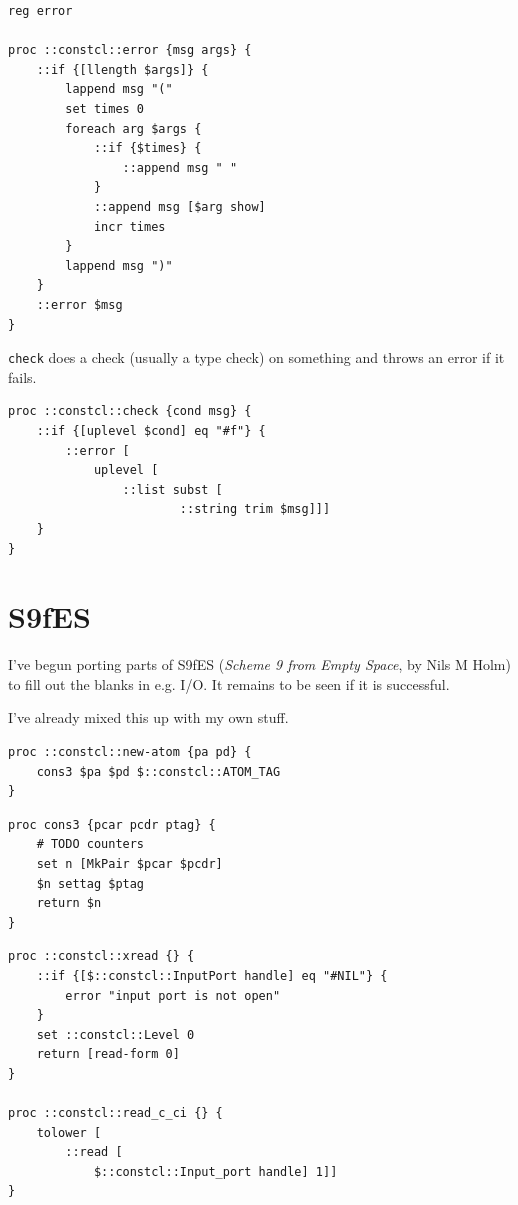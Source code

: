 \documentclass[twoside,9pt]{report}
\begin{document}
\noindent\makebox[\linewidth]{\rule{\linewidth}{0.4pt}}
\begin{lstlisting}
reg error
 
proc ::constcl::error {msg args} {
    ::if {[llength $args]} {
        lappend msg "("
        set times 0
        foreach arg $args {
            ::if {$times} {
                ::append msg " "
            }
            ::append msg [$arg show]
            incr times
        }
        lappend msg ")"
    }
    ::error $msg
}
\end{lstlisting}
\noindent\makebox[\linewidth]{\rule{\linewidth}{0.4pt}}

\texttt{check} does a check (usually a type check) on something and throws an error if it fails.

\noindent\makebox[\linewidth]{\rule{\linewidth}{0.4pt}}
\begin{lstlisting}
proc ::constcl::check {cond msg} {
    ::if {[uplevel $cond] eq "#f"} {
        ::error [
            uplevel [
                ::list subst [
                        ::string trim $msg]]]
    }
}
\end{lstlisting}
\noindent\makebox[\linewidth]{\rule{\linewidth}{0.4pt}}
\section{S9fES}
\label{s9fes}

I've begun porting parts of S9fES (\emph{Scheme 9 from Empty Space}, by Nils M Holm) to fill out the blanks in e.g. I/O. It remains to be seen if it is successful.


I've already mixed this up with my own stuff.

\noindent\makebox[\linewidth]{\rule{\linewidth}{0.4pt}}
\begin{lstlisting}
proc ::constcl::new-atom {pa pd} {
    cons3 $pa $pd $::constcl::ATOM_TAG
}
\end{lstlisting}
\noindent\makebox[\linewidth]{\rule{\linewidth}{0.4pt}}
\noindent\makebox[\linewidth]{\rule{\linewidth}{0.4pt}}
\begin{lstlisting}
proc cons3 {pcar pcdr ptag} {
    # TODO counters
    set n [MkPair $pcar $pcdr]
    $n settag $ptag
    return $n
}
\end{lstlisting}
\noindent\makebox[\linewidth]{\rule{\linewidth}{0.4pt}}
\noindent\makebox[\linewidth]{\rule{\linewidth}{0.4pt}}
\begin{lstlisting}
proc ::constcl::xread {} {
    ::if {[$::constcl::InputPort handle] eq "#NIL"} {
        error "input port is not open"
    }
    set ::constcl::Level 0
    return [read-form 0]
}
 
proc ::constcl::read_c_ci {} {
    tolower [
        ::read [
            $::constcl::Input_port handle] 1]]
}
\end{lstlisting}
\noindent\makebox[\linewidth]{\rule{\linewidth}{0.4pt}}
\end{document}
